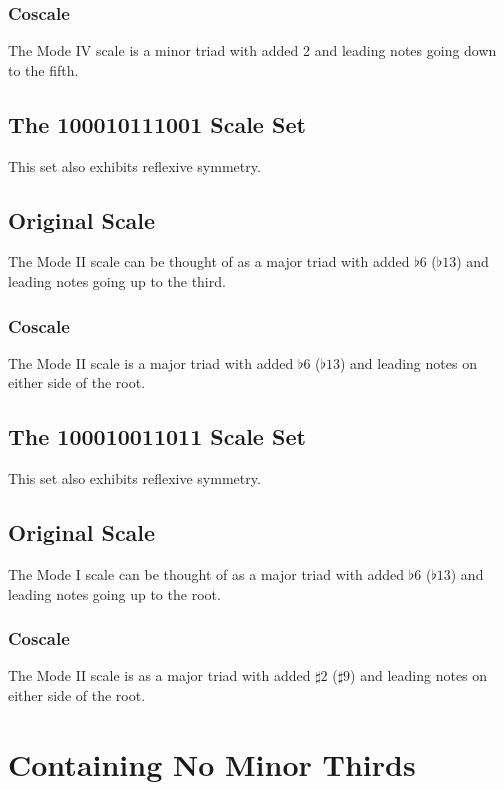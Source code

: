 \documentclass[english]{./gbook}
\begin{document}
\begin{large}
\subsubsection*{Coscale}
The Mode IV scale is a minor triad with added 2 and leading notes going down to the fifth.

\subsection{The 100010111001 Scale Set}
This set also exhibits reflexive symmetry.
\subsection*{Original Scale}
The Mode II scale can be thought of as a major triad with added $\flat6$ ($\flat13$) and leading notes going up to the third.
\subsubsection*{Coscale}
The Mode II scale is a major triad with added $\flat6$ ($\flat13$) and leading notes on either side of the root.



\subsection{The 100010011011 Scale Set}
This set also exhibits reflexive symmetry.
\subsection*{Original Scale}
The Mode I scale can be thought of as a major triad with added $\flat6$ ($\flat13$) and leading notes going up to the root.
\subsubsection*{Coscale}
The Mode II scale is as a major triad with added $\sharp2$ ($\sharp9$) and leading notes on either side of the root.



\section{Containing No Minor Thirds}


\end{large}
\end{document}
